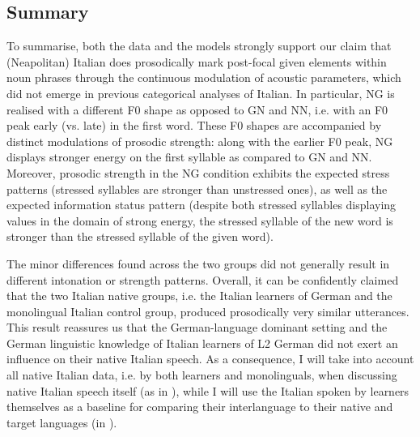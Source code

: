 \subsection{Summary}
\label{sec:2.3.3}
To summarise, both the data and the models strongly support our claim that (Neapolitan) Italian does prosodically mark post-focal given elements within noun phrases through the continuous modulation of acoustic parameters, which did not emerge in previous categorical analyses of Italian. In particular, NG is realised with a different F0 shape as opposed to GN and NN, i.e. with an F0 peak early (vs. late) in the first word. These F0 shapes are accompanied by distinct modulations of prosodic strength: along with the earlier F0 peak, NG displays stronger energy on the first syllable as compared to GN and NN. Moreover, prosodic strength in the NG condition exhibits the expected stress patterns (stressed syllables are stronger than unstressed ones), as well as the expected information status pattern (despite both stressed syllables displaying values in the domain of strong energy, the stressed syllable of the new word is stronger than the stressed syllable of the given word).

\newpage
The minor differences found across the two groups did not generally result in different intonation or strength patterns. Overall, it can be confidently claimed that the two Italian native groups, i.e. the Italian learners of German and the monolingual Italian control group, produced prosodically very similar utterances. This result reassures us that the German-language dominant setting and the German linguistic knowledge of Italian learners of L2 German did not exert an influence on their native Italian speech. As a consequence, I will take into account all native Italian data, i.e. by both learners and monolinguals, when discussing native Italian speech itself (as in ), while I will use the Italian spoken by learners themselves as a baseline for comparing their interlanguage to their native and target languages (in ).

